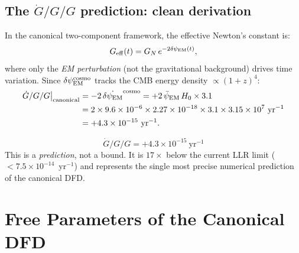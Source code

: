 \documentclass[11pt]{article}
\newcommand{\ee}[1]{\times 10^{#1}}
\newcommand{\dpsiEM}{\delta\psi_{\rm EM}}
\newcommand{\psiEM}{\bar{\psi}_{\rm EM}}
\newcommand{\GN}{G_N}
\newcommand{\Geff}{G_{\rm eff}}
\newcommand{\Gdot}{\dot{G}/G}
\newcommand{\Hzero}{H_0}
\begin{document}
\subsection{The $\Gdot/G$ prediction: clean derivation}

In the canonical two-component framework, the effective Newton's constant is:
\begin{equation}
\Geff(t) = \GN\,e^{-2\dpsiEM(t)},
\label{eq:Geff-canonical}
\end{equation}
where only the \emph{EM perturbation} (not the gravitational background)
drives time variation. Since $\dpsiEM^{\rm cosmo}$ tracks the CMB energy
density $\propto (1+z)^4$:
\begin{align}
\Gdot/G\big|_{\rm canonical}
&= -2\,\dot{\dpsiEM}^{\rm cosmo}
= +2\,\psiEM\,\Hzero\times 3.1 \nonumber\\
&= 2\times 9.6\ee{-6}\times 2.27\ee{-18}\times 3.1\times 3.15\ee{7}
~\text{yr}^{-1} \nonumber\\
&= +4.3\ee{-15}~\text{yr}^{-1}.
\label{eq:Gdot-canonical}
\end{align}

\begin{tcolorbox}[colback=green!5!white, colframe=green!60!black,
  title=\textbf{Canonical $\Gdot/G$: Firm Prediction}]
\begin{equation}
\boxed{\Gdot/G = +4.3\ee{-15}~\text{yr}^{-1}}
\label{eq:Gdot-boxed}
\end{equation}
This is a \emph{prediction}, not a bound. It is $17\times$ below the
current LLR limit ($< 7.5\ee{-14}$~yr$^{-1}$) and represents the
single most precise numerical prediction of the canonical DFD.
\end{tcolorbox}

\section{Free Parameters of the Canonical DFD}
\label{sec:parameters}
\end{document}
